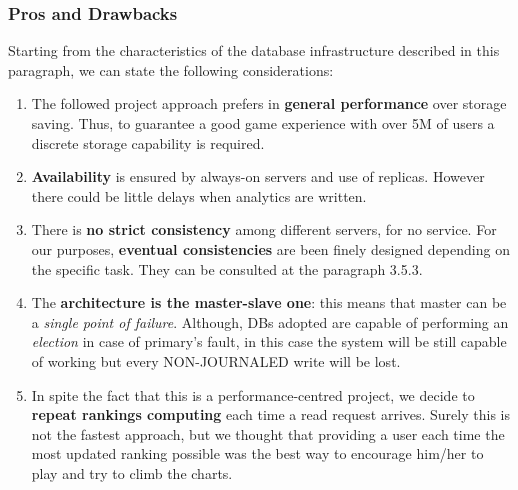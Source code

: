 \subsubsection{Pros and Drawbacks}
Starting from the characteristics of the database infrastructure described in this paragraph, we can state the following considerations:
\begin{enumerate}
	\item The followed project approach prefers in \textbf{general performance} over storage saving. Thus, to guarantee a good game experience with over 5M of users a discrete storage capability is required.
	\item \textbf{Availability} is ensured by always-on servers and use of replicas. However there could be little delays when analytics are written. 
	\item There is \textbf{no strict consistency} among different servers, for no service. For our purposes, \textbf{eventual consistencies} are been finely designed depending on the specific task. They can be consulted at the paragraph 3.5.3.
	\item The \textbf{architecture is the master-slave one}: this means that master can be a \textit{single point of failure}. Although, DBs adopted are capable of performing an \textit{election} in case of primary’s fault, in this case the system will be still capable of working but every NON-JOURNALED write will be lost.  
	\item In spite the fact that this is a performance-centred project, we decide to \textbf{repeat rankings computing} each time a read request arrives. Surely this is not the fastest approach, but we thought that providing a user each time the most updated ranking possible was the best way to encourage him/her to play and try to climb the charts.
\end{enumerate}

